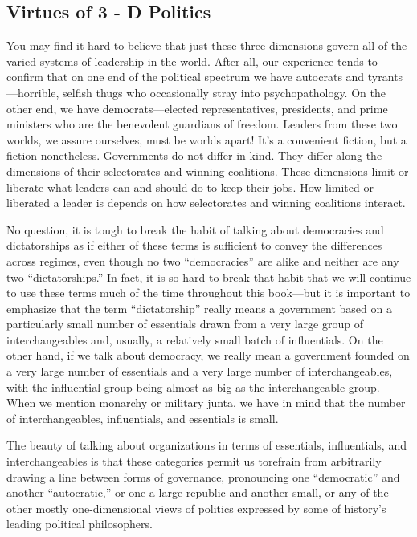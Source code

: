 \documentclass[10pt]{article}
\begin{document}
\subsection{Virtues of 3 - D Politics}

{\large You may find it hard to believe that just these three dimensions govern
all of the varied systems of leadership in the world. After all, our experience
tends to confirm that on one end of the political spectrum we have autocrats and
tyrants---horrible, selfish thugs who occasionally stray into psychopathology. On
the other end, we have democrats---elected representatives, presidents, and prime
ministers who are the benevolent guardians of freedom. Leaders from these two
worlds, we assure ourselves, must be worlds apart! It's a convenient fiction, but
a fiction nonetheless. Governments do not differ in kind. They differ along the
dimensions of their selectorates and winning coalitions. These dimensions limit
or liberate what leaders can and should do to keep their jobs. How limited or
liberated a leader is depends on how selectorates and winning coalitions
interact.}

{\large No question, it is tough to break the habit of talking about democracies
and dictatorships as if either of these terms is sufficient to convey the
differences across regimes, even though no two ``democracies'' are alike and
neither are any two ``dictatorships.'' In fact, it is so hard to break that habit
that we will continue to use these terms much of the time throughout this
book---but it is important to emphasize that the term ``dictatorship'' really
means a government based on a particularly small number of essentials drawn from
a very large group of interchangeables and, usually, a relatively small batch of
influentials. On the other hand, if we talk about democracy, we really mean a
government founded on a very large number of essentials and a very large number
of interchangeables, with the influential group being almost as big as the
interchangeable group. When we mention monarchy or military junta, we have in
mind that the number of interchangeables, influentials, and essentials is small.}

{\large The beauty of talking about organizations in terms of essentials,
influentials, and interchangeables is that these categories permit us torefrain
from arbitrarily drawing a line between forms of governance, pronouncing one
``democratic'' and another ``autocratic,'' or one a large republic and another
small, or any of the other mostly one-dimensional views of politics expressed by
some of history's leading political philosophers.}
\end{document}
